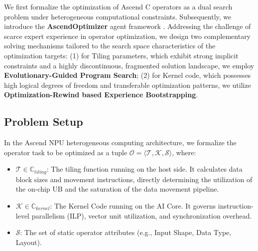 \documentclass{article}
\theoremstyle{plain}
\theoremstyle{definition}
\theoremstyle{remark}
\begin{document}
We first formalize the optimization of Ascend C operators as a dual search problem under heterogeneous computational constraints. Subsequently, we introduce the \textbf{AscendOptimizer} agent framework
. Addressing the challenge of scarce expert experience in operator optimization, we design two complementary solving mechanisms tailored to the search space characteristics of the optimization targets: (1) for Tiling parameters, which exhibit strong implicit constraints and a highly discontinuous, fragmented solution landscape, we employ \textbf{Evolutionary-Guided Program Search}; (2) for Kernel code, which possesses high logical degrees of freedom and transferable optimization patterns, we utilize \textbf{Optimization-Rewind based Experience Bootstrapping}.

\subsection{Problem Setup}

In the Ascend NPU heterogeneous computing architecture, we formalize the operator task to be optimized as a tuple $\mathcal{O} = \langle \mathcal{T}, \mathcal{K}, \mathcal{S} \rangle$, where:
\begin{itemize}[leftmargin=*]
    \item $\mathcal{T} \in \mathbb{C}_{tiling}$: The tiling function running on the host side. It calculates data block sizes and movement instructions, directly determining the utilization of the on-chip UB and the saturation of the data movement pipeline.
    \item $\mathcal{K} \in \mathbb{C}_{kernel}$: The Kernel Code running on the AI Core. It governs instruction-level parallelism (ILP), vector unit utilization, and synchronization overhead.
    \item $\mathcal{S}$: The set of static operator attributes (e.g., Input Shape, Data Type, Layout).
\end{itemize}
\end{document}
